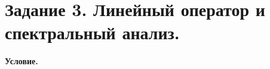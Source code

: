 \section{Задание 3. Линейный оператор и спектральный анализ.}

\textbf{Условие.}



\vspace{20mm}





